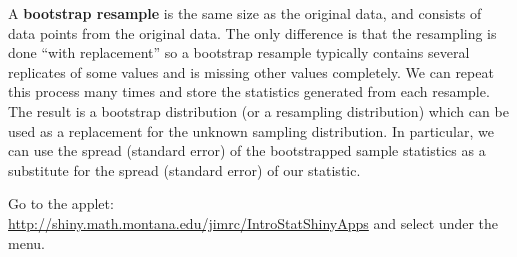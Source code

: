   A {\bf bootstrap resample} is the same size as the original data, and
  consists of data points from the original data.  The only difference
  is that the resampling is done ``with replacement'' so a bootstrap
  resample typically contains several replicates of some values and is
  missing other values completely.  We can repeat this process many
  times and store the statistics generated from each resample.  The
  result is a bootstrap distribution (or a resampling distribution)
  which can be used as a replacement for the unknown sampling
  distribution.  In particular, we can use the spread (standard error)
  of the bootstrapped sample statistics as a substitute for the spread
  (standard error) of our statistic.  

   

Go to  the applet:\\
\url{http://shiny.math.montana.edu/jimrc/IntroStatShinyApps} and
select under the  menu.
\vspace{-.2in}
